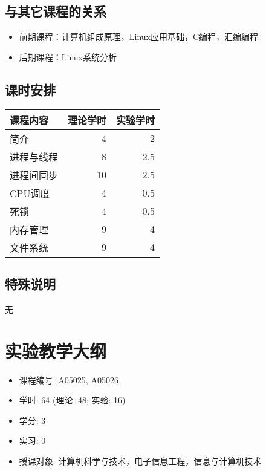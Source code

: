 \documentclass{wx672article}
\begin{document}
\subsection{与其它课程的关系}
\label{sec-2-4}

\begin{itemize}
\item 前期课程：计算机组成原理，Linux应用基础，C编程，汇编编程
\item 后期课程：Linux系统分析
\end{itemize}

\subsection{课时安排}
\label{sec-2-5}

\begin{center}
  \begin{tabular}{lrr}
    \hline
    课程内容 & 理论学时 & 实验学时\\
    \hline
    简介 & 4 & 2\\
    进程与线程 & 8 & 2.5\\
    进程间同步 & 10 & 2.5\\
    CPU调度 & 4 & 0.5\\
    死锁 & 4 & 0.5\\
    内存管理 & 9 & 4\\
    文件系统 & 9 & 4\\
    \hline
  \end{tabular}
\end{center}

\subsection{特殊说明}
\label{sec-2-6}

无

\section{实验教学大纲}
\label{sec:lab}

\begin{itemize}
\item 课程编号: A05025, A05026
\item 学时: 64 (理论: 48; 实验: 16)
\item 学分: 3
\item 实习: 0
\item 授课对象: 计算机科学与技术，电子信息工程，信息与计算机技术
\end{itemize}
\end{document}
